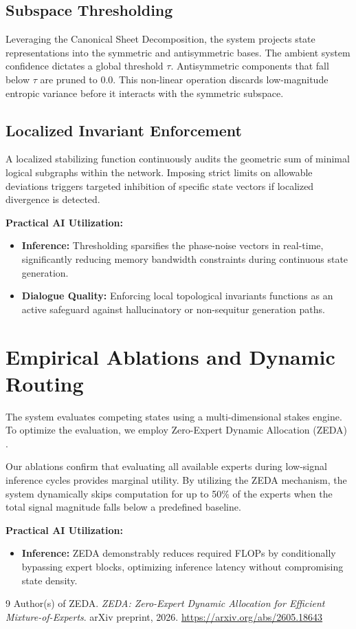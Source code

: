 \documentclass[11pt,a4paper]{article}
\begin{document}
\subsection{Subspace Thresholding}
Leveraging the Canonical Sheet Decomposition, the system projects state representations into the symmetric and antisymmetric bases. The ambient system confidence dictates a global threshold $\tau$. Antisymmetric components that fall below $\tau$ are pruned to $0.0$. This non-linear operation discards low-magnitude entropic variance before it interacts with the symmetric subspace.

\subsection{Localized Invariant Enforcement}
A localized stabilizing function continuously audits the geometric sum of minimal logical subgraphs within the network. Imposing strict limits on allowable deviations triggers targeted inhibition of specific state vectors if localized divergence is detected.

\textbf{Practical AI Utilization:}
\begin{itemize}
    \item \textbf{Inference:} Thresholding sparsifies the phase-noise vectors in real-time, significantly reducing memory bandwidth constraints during continuous state generation.
    \item \textbf{Dialogue Quality:} Enforcing local topological invariants functions as an active safeguard against hallucinatory or non-sequitur generation paths.
\end{itemize}

\section{Empirical Ablations and Dynamic Routing}
The system evaluates competing states using a multi-dimensional stakes engine. To optimize the evaluation, we employ Zero-Expert Dynamic Allocation (ZEDA) \cite{zeda2026}. 

Our ablations confirm that evaluating all available experts during low-signal inference cycles provides marginal utility. By utilizing the ZEDA mechanism, the system dynamically skips computation for up to 50\% of the experts when the total signal magnitude falls below a predefined baseline. 

\textbf{Practical AI Utilization:}
\begin{itemize}
    \item \textbf{Inference:} ZEDA demonstrably reduces required FLOPs by conditionally bypassing expert blocks, optimizing inference latency without compromising state density.
\end{itemize}

\begin{thebibliography}{9}
Author(s) of ZEDA. 
\textit{ZEDA: Zero-Expert Dynamic Allocation for Efficient Mixture-of-Experts}. 
arXiv preprint, 2026. \url{https://arxiv.org/abs/2605.18643}
\end{thebibliography}
\end{document}
